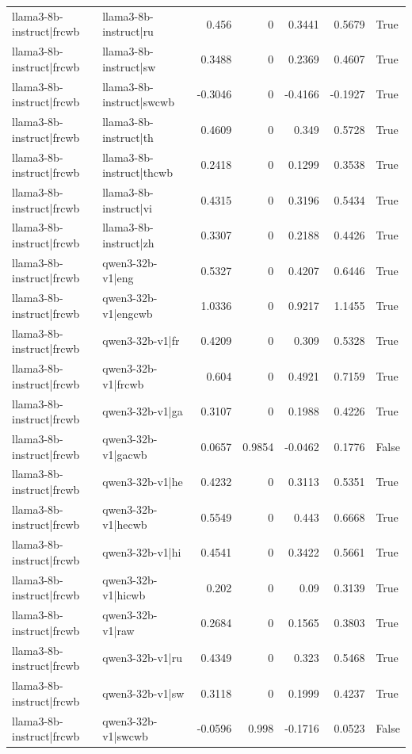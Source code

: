 \begin{table}
\begin{tabular}{l l r r r r l}
llama3-8b-instruct|frcwb & llama3-8b-instruct|ru & 0.456 & 0 & 0.3441 & 0.5679 & True \\
llama3-8b-instruct|frcwb & llama3-8b-instruct|sw & 0.3488 & 0 & 0.2369 & 0.4607 & True \\
llama3-8b-instruct|frcwb & llama3-8b-instruct|swcwb & -0.3046 & 0 & -0.4166 & -0.1927 & True \\
llama3-8b-instruct|frcwb & llama3-8b-instruct|th & 0.4609 & 0 & 0.349 & 0.5728 & True \\
llama3-8b-instruct|frcwb & llama3-8b-instruct|thcwb & 0.2418 & 0 & 0.1299 & 0.3538 & True \\
llama3-8b-instruct|frcwb & llama3-8b-instruct|vi & 0.4315 & 0 & 0.3196 & 0.5434 & True \\
llama3-8b-instruct|frcwb & llama3-8b-instruct|zh & 0.3307 & 0 & 0.2188 & 0.4426 & True \\
llama3-8b-instruct|frcwb & qwen3-32b-v1|eng & 0.5327 & 0 & 0.4207 & 0.6446 & True \\
llama3-8b-instruct|frcwb & qwen3-32b-v1|engcwb & 1.0336 & 0 & 0.9217 & 1.1455 & True \\
llama3-8b-instruct|frcwb & qwen3-32b-v1|fr & 0.4209 & 0 & 0.309 & 0.5328 & True \\
llama3-8b-instruct|frcwb & qwen3-32b-v1|frcwb & 0.604 & 0 & 0.4921 & 0.7159 & True \\
llama3-8b-instruct|frcwb & qwen3-32b-v1|ga & 0.3107 & 0 & 0.1988 & 0.4226 & True \\
llama3-8b-instruct|frcwb & qwen3-32b-v1|gacwb & 0.0657 & 0.9854 & -0.0462 & 0.1776 & False \\
llama3-8b-instruct|frcwb & qwen3-32b-v1|he & 0.4232 & 0 & 0.3113 & 0.5351 & True \\
llama3-8b-instruct|frcwb & qwen3-32b-v1|hecwb & 0.5549 & 0 & 0.443 & 0.6668 & True \\
llama3-8b-instruct|frcwb & qwen3-32b-v1|hi & 0.4541 & 0 & 0.3422 & 0.5661 & True \\
llama3-8b-instruct|frcwb & qwen3-32b-v1|hicwb & 0.202 & 0 & 0.09 & 0.3139 & True \\
llama3-8b-instruct|frcwb & qwen3-32b-v1|raw & 0.2684 & 0 & 0.1565 & 0.3803 & True \\
llama3-8b-instruct|frcwb & qwen3-32b-v1|ru & 0.4349 & 0 & 0.323 & 0.5468 & True \\
llama3-8b-instruct|frcwb & qwen3-32b-v1|sw & 0.3118 & 0 & 0.1999 & 0.4237 & True \\
llama3-8b-instruct|frcwb & qwen3-32b-v1|swcwb & -0.0596 & 0.998 & -0.1716 & 0.0523 & False \\

\end{tabular}
\end{table}
